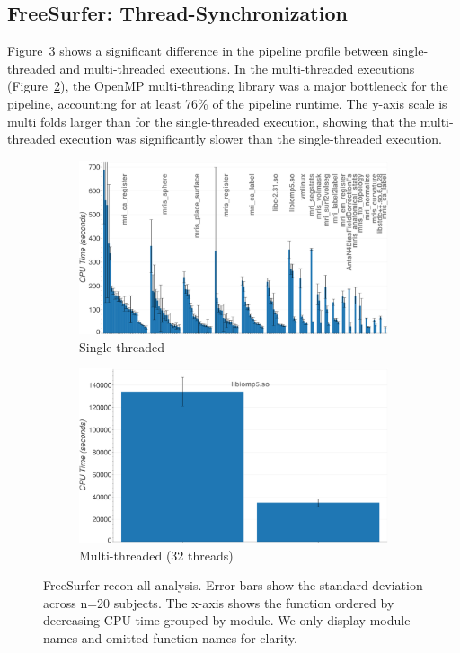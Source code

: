 \documentclass[conference]{IEEEtran}
\begin{document}
\subsection{FreeSurfer: Thread-Synchronization}
Figure~\ref{fig:hotspots-freesurfer-reconall} shows a significant difference in the pipeline profile between single-threaded and multi-threaded executions. In the multi-threaded executions (Figure~\ref{subfig:hotspots-freesurfer-reconall-32threads}), the OpenMP multi-threading library was a major bottleneck for the pipeline, accounting for at least 76\% of the pipeline runtime. The y-axis scale is multi folds larger than for the single-threaded execution, showing that the multi-threaded execution was significantly slower than the single-threaded execution.
					
\begin{figure}
	\centering
	\begin{subfigure}[t]{0.49\textwidth}
		\caption{Single-threaded}
		\label{subfig:hotspots-freesurfer-reconall-1thread}
		\includegraphics[width=\textwidth]{figures/hotspots-1threads-freesurfer-reconall-simple.png}
	\end{subfigure}
	\begin{subfigure}[t]{0.49\textwidth}
		\caption{Multi-threaded (32 threads)}
		\label{subfig:hotspots-freesurfer-reconall-32threads}
		\includegraphics[width=\textwidth]{figures/hotspots-32threads-freesurfer-reconall-simple.png}
	\end{subfigure}
	\caption{FreeSurfer recon-all analysis. Error bars show the standard deviation across n=20 subjects. The x-axis shows the function ordered by decreasing CPU time grouped by module. We only display module names and omitted function names for clarity.}
	\label{fig:hotspots-freesurfer-reconall}
\end{figure}
\end{document}

